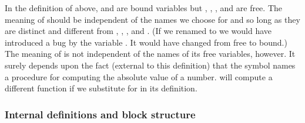 In the definition of  above,  and  are bound variables but \code{<}, \code{-}, , and  are free.
The meaning of  should be independent of the names we choose for  and  so long as they are distinct and different from \code{<}, \code{-}, , and .
(If we renamed  to  we would have introduced a bug by  the variable .
It would have changed from free to bound.)
The meaning of  is not independent of the names of its free variables, however.
It surely depends upon the fact (external to this definition) that the symbol  names a procedure for computing the absolute value of a number.
 will compute a different function if we substitute  for  in its definition.



\subsubsection*{Internal definitions and block structure}


